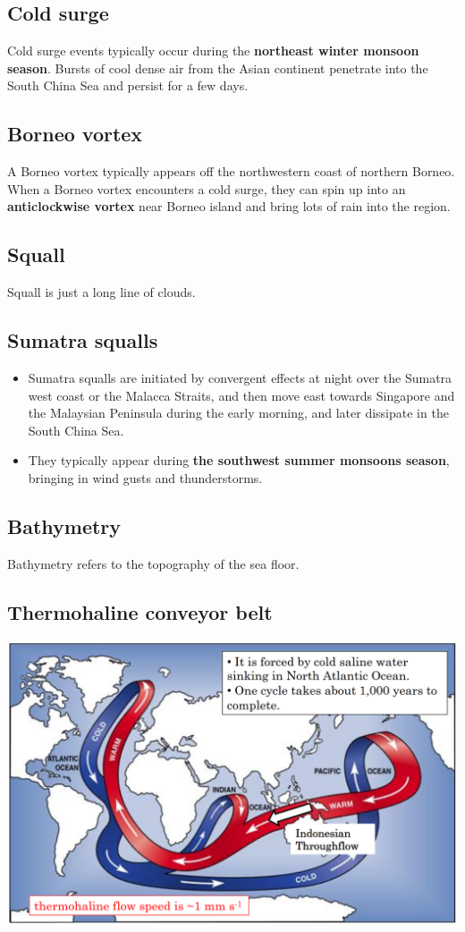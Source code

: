 \documentclass[11pt]{article}
\begin{document}
\subsection{Cold surge}
\label{sec:orgb4cabaf}
Cold surge events typically occur during the \textbf{northeast winter monsoon season}. Bursts of cool dense air from the Asian continent penetrate into the South China Sea and persist for a few days.
\subsection{Borneo vortex}
\label{sec:orgf5baf03}
A Borneo vortex typically appears off the northwestern coast of northern Borneo. When a Borneo vortex encounters a cold surge, they can spin up into an \textbf{anticlockwise vortex} near Borneo island and bring lots of rain into the region.

\newpage
\subsection{Squall}
\label{sec:org99adafb}
Squall is just a long line of clouds.
\subsection{Sumatra squalls}
\label{sec:org9a54597}
\begin{itemize}
\item Sumatra squalls are initiated by convergent effects at night over the Sumatra west coast or the Malacca Straits, and then move east towards Singapore and the Malaysian Peninsula during the early morning, and later dissipate in the South China Sea.
\item They typically appear during \textbf{the southwest summer monsoons season}, bringing in wind gusts and thunderstorms.
\end{itemize}
\subsection{Bathymetry}
\label{sec:org4fee739}
Bathymetry refers to the topography of the sea floor.
\subsection{Thermohaline conveyor belt}
\label{sec:org5f217b5}
\begin{center}
\includegraphics[width=.9\linewidth]{./images/thermohaline-conveyor-belt.png}
\end{center}
\end{document}
